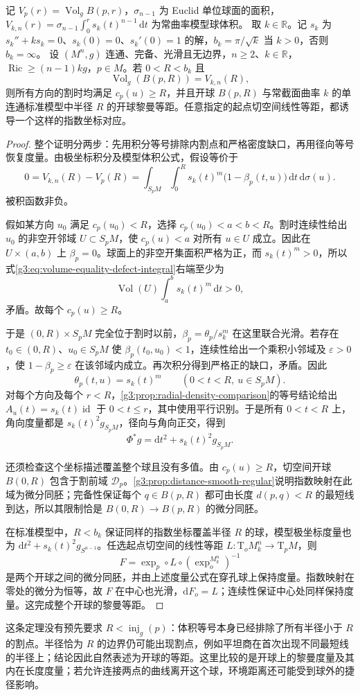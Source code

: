 \begin{theorem}\label{g3:thm:volume-equality-rigidity}
	记 \(V_p(r)=\operatorname{Vol}_g B(p,r)\)，\(\sigma_{n-1}\) 为 Euclid 单位球面的面积，\(V_{k,n}(r)=\sigma_{n-1}\int_0^r s_k(t)^{n-1}\,\mathrm dt\) 为常曲率模型球体积。
	取 \(k\in\mathbb R\)。记 \(s_k\) 为 \(s_k''+ks_k=0\)、\(s_k(0)=0\)、\(s_k'(0)=1\) 的解，\(b_k=\pi/\sqrt k\) 当 \(k>0\)，否则 \(b_k=\infty\)。
	设 \((M^n,g)\) 连通、完备、光滑且无边界，\(n\ge2\)、\(k\in\mathbb R\)，\(\operatorname{Ric}\ge(n-1)kg\)，\(p\in M\)。若 \(0<R<b_k\) 且
	\[
		\operatorname{Vol}_g(B(p,R))=V_{k,n}(R),
	\]
	则所有方向的割时均满足 \(c_p(u)\ge R\)，并且开球 \(B(p,R)\) 与常截面曲率 \(k\) 的单连通标准模型中半径 \(R\) 的开球黎曼等距。任意指定的起点切空间线性等距，都诱导一个这样的指数坐标对应。
\end{theorem}
\begin{proof}
	整个证明分两步：先用积分等号排除内割点和严格密度缺口，再用径向等号恢复度量。由极坐标积分及模型体积公式，假设等价于
	\begin{equation}\label{g3:eq:volume-equality-defect-integral}
		0=V_{k,n}(R)-V_p(R)
		=\int_{S_pM}\int_0^R
		s_k(t)^m\bigl(1-\beta_p(t,u)\bigr)\,\mathrm dt\,\mathrm d\sigma(u).
	\end{equation}
	被积函数非负。

	假如某方向 \(u_0\) 满足 \(c_p(u_0)<R\)，选择 \(c_p(u_0)<a<b<R\)。割时连续性给出 \(u_0\) 的非空开邻域 \(U\subset S_pM\)，使 \(c_p(u)<a\) 对所有 \(u\in U\) 成立。因此在 \(U\times(a,b)\) 上 \(\beta_p=0\)。球面上的非空开集面积严格为正，而 \(s_k(t)^m>0\)，所以式\eqref{g3:eq:volume-equality-defect-integral}右端至少为
	\[
		\operatorname{Vol}(U)\int_a^b s_k(t)^m\,\mathrm dt>0,
	\]
	矛盾。故每个 \(c_p(u)\ge R\)。

	于是 \((0,R)\times S_pM\) 完全位于割时以前，\(\beta_p=\theta_p/s_k^m\) 在这里联合光滑。若存在 \(t_0\in(0,R)\)、\(u_0\in S_pM\) 使 \(\beta_p(t_0,u_0)<1\)，连续性给出一个乘积小邻域及 \(\varepsilon>0\)，使 \(1-\beta_p\ge\varepsilon\) 在该邻域内成立。再次积分得到严格正的缺口，矛盾。因此
	\[
		\theta_p(t,u)=s_k(t)^m
		\qquad(0<t<R,\ u\in S_pM).
	\]
	对每个方向及每个 \(r<R\)，\cref{g3:prop:radial-density-comparison}的等号结论给出 \(A_u(t)=s_k(t)\operatorname{id}\) 于 \(0<t\le r\)，其中使用平行识别。于是所有 \(0<t<R\) 上，角向度量都是 \(s_k(t)^2g_{S_pM}\)，径向与角向正交，得到
	\[
		\Phi^*g=\mathrm dt^2+s_k(t)^2g_{S_pM}.
	\]

	还须检查这个坐标描述覆盖整个球且没有多值。由 \(c_p(u)\ge R\)，切空间开球 \(B(0,R)\) 包含于割前域 \(\mathcal D_p\)。\cref{g3:prop:distance-smooth-regular}说明指数映射在此域为微分同胚；完备性保证每个 \(q\in B(p,R)\) 都可由长度 \(d(p,q)<R\) 的最短线到达，所以其限制恰是 \(B(0,R)\to B(p,R)\) 的微分同胚。

	在标准模型中，\(R<b_k\) 保证同样的指数坐标覆盖半径 \(R\) 的球，模型极坐标度量也为 \(\mathrm dt^2+s_k(t)^2g_{S^{n-1}}\)。任选起点切空间的线性等距 \(L:\mathrm T_oM_k^n\to\mathrm T_pM\)，则
	\[
		F=\exp_p\circ L\circ(\exp_o^{M_k^n})^{-1}
	\]
	是两个开球之间的微分同胚，并由上述度量公式在穿孔球上保持度量。指数映射在零处的微分为恒等，故 \(F\) 在中心也光滑，\(\mathrm dF_o=L\)；连续性保证中心处同样保持度量。这完成整个开球的黎曼等距。
\end{proof}

这条定理没有预先要求 \(R<\operatorname{inj}_g(p)\)：体积等号本身已经排除了所有半径小于 \(R\) 的割点。半径恰为 \(R\) 的边界仍可能出现割点，例如平坦商在首次出现不同最短线的半径上；结论因此自然表述为开球的等距。这里比较的是开球上的黎曼度量及其内在长度度量；若允许连接两点的曲线离开这个球，环境距离还可能受到球外的捷径影响。
